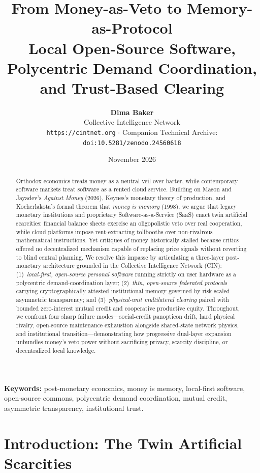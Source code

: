 \documentclass[11pt]{article}
\title{\textbf{From Money-as-Veto to Memory-as-Protocol}\\[4pt]
\large Local Open-Source Software, Polycentric Demand Coordination, and Trust-Based Clearing}
\author{\textbf{Dima Baker}\\
Collective Intelligence Network\\
{\small\texttt{https://cintnet.org} $\cdot$ Companion Technical Archive: \texttt{doi:10.5281/zenodo.24560618}}}
\date{November 2026}
\begin{document}
\maketitle

\begin{abstract}
Orthodox economics treats money as a neutral veil over barter, while contemporary software markets treat software as a rented cloud service. Building on Mason and Jayadev's \emph{Against Money} (2026), Keynes's monetary theory of production, and Kocherlakota's formal theorem that \emph{money is memory} (1998), we argue that legacy monetary institutions and proprietary Software-as-a-Service (SaaS) enact twin artificial scarcities: financial balance sheets exercise an oligopolistic veto over real cooperation, while cloud platforms impose rent-extracting tollbooths over non-rivalrous mathematical instructions. Yet critiques of money historically stalled because critics offered no decentralized mechanism capable of replacing price signals without reverting to blind central planning. We resolve this impasse by articulating a three-layer post-monetary architecture grounded in the Collective Intelligence Network (CIN): (1)~\emph{local-first, open-source personal software} running strictly on user hardware as a polycentric demand-coordination layer; (2)~\emph{thin, open-source federated protocols} carrying cryptographically attested institutional memory governed by risk-scaled asymmetric transparency; and (3)~\emph{physical-unit multilateral clearing} paired with bounded zero-interest mutual credit and cooperative productive equity. Throughout, we confront four sharp failure modes---social-credit panopticon drift, hard physical rivalry, open-source maintenance exhaustion alongside shared-state network physics, and institutional transition---demonstrating how progressive dual-layer expansion unbundles money's veto power without sacrificing privacy, scarcity discipline, or decentralized local knowledge.
\end{abstract}

\noindent\textbf{Keywords:} post-monetary economics, money is memory, local-first software, open-source commons, polycentric demand coordination, mutual credit, asymmetric transparency, institutional trust.

\section{Introduction: The Twin Artificial Scarcities}\label{sec:intro}
\end{document}
